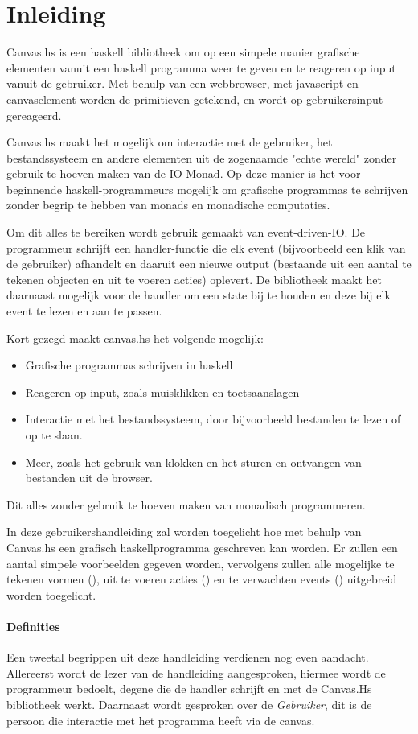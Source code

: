 \section{Inleiding}

Canvas.hs is een haskell bibliotheek om op een simpele manier grafische elementen vanuit een haskell programma weer te geven en te reageren op input vanuit de gebruiker. Met behulp van een webbrowser, met javascript en canvaselement worden de primitieven getekend, en wordt op gebruikersinput gereageerd.

Canvas.hs maakt het mogelijk om interactie met de gebruiker, het bestandssysteem en andere elementen uit de zogenaamde "echte wereld" zonder gebruik te hoeven maken van de IO Monad. Op deze manier is het voor beginnende haskell-programmeurs mogelijk om grafische programmas te schrijven zonder begrip te hebben van monads en monadische computaties.

Om dit alles te bereiken wordt gebruik gemaakt van event-driven-IO. De programmeur schrijft een handler-functie die elk event (bijvoorbeeld een klik van de gebruiker) afhandelt en daaruit een nieuwe output (bestaande uit een aantal te tekenen objecten en uit te voeren acties) oplevert. De bibliotheek maakt het daarnaast mogelijk voor de handler om een state bij te houden en deze bij elk event te lezen en aan te passen. 

Kort gezegd maakt canvas.hs het volgende mogelijk:
\begin{itemize}
	\item Grafische programmas schrijven in haskell
	\item Reageren op input, zoals muisklikken en toetsaanslagen
	\item Interactie met het bestandssysteem, door bijvoorbeeld bestanden te lezen of op te slaan.
	\item Meer, zoals het gebruik van klokken en het sturen en ontvangen van bestanden uit de browser.
\end{itemize}
Dit alles zonder gebruik te hoeven maken van monadisch programmeren. 

In deze gebruikershandleiding zal worden toegelicht hoe met behulp van Canvas.hs een grafisch haskellprogramma geschreven kan worden. Er zullen een aantal simpele voorbeelden gegeven worden, vervolgens zullen alle mogelijke te tekenen vormen (\shapes), uit te voeren acties (\actions) en te verwachten events (\events) uitgebreid worden toegelicht. 

\paragraph{Definities} 
Een tweetal begrippen uit deze handleiding verdienen nog even aandacht. Allereerst wordt de lezer van de handleiding aangesproken, hiermee wordt de programmeur bedoelt, degene die de handler schrijft en met de Canvas.Hs bibliotheek werkt. Daarnaast wordt gesproken over de \emph{Gebruiker}, dit is de persoon die interactie met het programma heeft via de canvas.